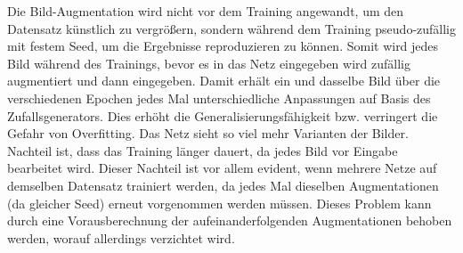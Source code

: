 Die Bild-Augmentation wird nicht vor dem Training angewandt, um den Datensatz künstlich zu vergrößern, 
sondern während dem Training pseudo-zufällig mit festem Seed, um die Ergebnisse reproduzieren zu können.
Somit wird jedes Bild während des Trainings, bevor es in das Netz eingegeben wird zufällig augmentiert 
und dann eingegeben. Damit erhält ein und dasselbe Bild über die verschiedenen Epochen jedes Mal unterschiedliche 
Anpassungen auf Basis des Zufallsgenerators. Dies erhöht die Generalisierungsfähigkeit bzw. 
verringert die Gefahr von Overfitting. Das Netz sieht so viel mehr Varianten der Bilder. 
Nachteil ist, dass das Training länger dauert, da jedes Bild vor Eingabe bearbeitet wird. 
Dieser Nachteil ist vor allem evident, wenn mehrere Netze auf demselben Datensatz trainiert werden, da jedes Mal 
dieselben Augmentationen (da gleicher Seed) erneut vorgenommen werden müssen. Dieses Problem kann
durch eine Vorausberechnung der aufeinanderfolgenden Augmentationen behoben werden, worauf allerdings verzichtet wird. 

